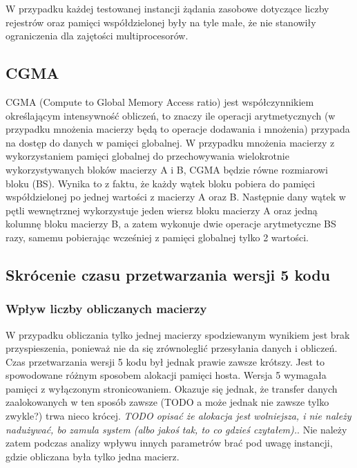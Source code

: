 \documentclass[12pt,a4paper]{article}
\begin{document}
W przypadku każdej testowanej instancji żądania zasobowe dotyczące liczby rejestrów oraz pamięci współdzielonej były na tyle małe, że nie stanowiły ograniczenia dla zajętości multiprocesorów.

\subsection{CGMA}

CGMA (Compute to Global Memory Access ratio) jest współczynnikiem określającym intensywność obliczeń, to znaczy ile operacji arytmetycznych (w przypadku mnożenia macierzy będą to operacje dodawania i mnożenia) przypada na dostęp do danych w pamięci globalnej. W przypadku mnożenia macierzy z wykorzystaniem pamięci globalnej do przechowywania wielokrotnie wykorzystywanych bloków macierzy A i B, CGMA będzie równe rozmiarowi bloku (BS). Wynika to z faktu, że każdy wątek bloku pobiera do pamięci współdzielonej po jednej wartości z macierzy A oraz B. Następnie dany wątek w pętli wewnętrznej wykorzystuje jeden wiersz bloku macierzy A oraz jedną kolumnę bloku macierzy B, a zatem wykonuje dwie operacje arytmetyczne BS razy, samemu pobierając wcześniej z pamięci globalnej tylko 2 wartości.

\subsection{Skrócenie czasu przetwarzania wersji 5 kodu}

\subsubsection{Wpływ liczby obliczanych macierzy}

W przypadku obliczania tylko jednej macierzy spodziewanym wynikiem jest brak przyspieszenia, ponieważ nie da się zrównoleglić przesyłania danych i obliczeń. Czas przetwarzania wersji 5 kodu był jednak prawie zawsze krótszy. Jest to spowodowane różnym sposobem alokacji pamięci hosta. Wersja 5 wymagała pamięci z wyłączonym stronicowaniem. Okazuje się jednak, że transfer danych zaalokowanych w ten sposób zawsze (TODO a może jednak nie zawsze tylko zwykle?) trwa nieco krócej. \textit{TODO opisać że alokacja jest wolniejsza, i nie należy nadużywać, bo zamula system (albo jakoś tak, to co gdzieś czytałem).}. Nie należy zatem podczas analizy wpływu innych parametrów brać pod uwagę instancji, gdzie obliczana była tylko jedna macierz.
\end{document}
